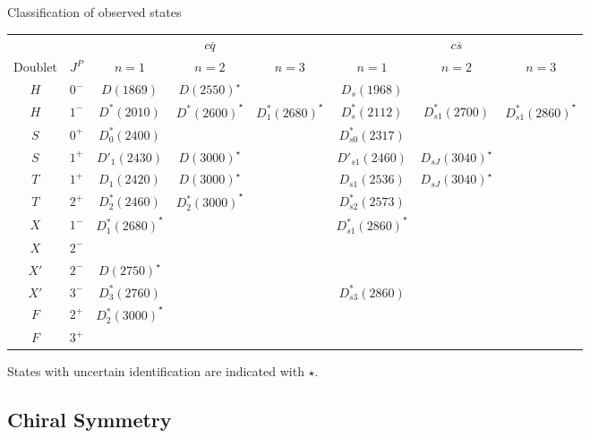\documentclass[professionalfonts,aspectratio=169]{beamer}
\newcommand{\adj}[1]{\overline{#1}}
\begin{document}
\begin{frame}{Classification of observed states}
  \begin{table}
    \centering
    \scriptsize
    \begin{tabular}{*{8}{c}}
      \toprule
      & & \multicolumn{3}{c}{$c \adj{q}$} & \multicolumn{3}{c}{$c \adj{s}$} \\
      Doublet { } & $J^P$ & $n = 1$ & $n = 2$ & $n = 3$ & $n = 1$ & $n = 2$ & $n = 3$ \\
      \midrule
      $H$ & $0^-$ & $D(1869)$ & $\left. D(2550) \right.^\star$ & & $D_s(1968)$ & & \\ 
      $H$ & $1^-$ & $D^*(2010)$ & $\left. D^* (2600) \right.^\star$ & $\left. D^*_1(2680) \right.^\star$ & $D_s^*(2112)$ & $D_{s1}^*(2700)$ & $\left. D^*_{s 1}(2860) \right.^\star$ \\
      $S$ & $0^+$ & $D^*_0(2400)$ & & & $D_{s0}^*(2317)$ & & \\
      $S$ & $1^+$ & $D'_1(2430)$ & $\left. D(3000) \right.^\star$ & & $D'_{s1}(2460)$ & $\left. D_{sJ}(3040) \right.^\star$ & \\
      $T$ & $1^+$ & $D_1(2420)$ & $\left. D(3000) \right.^\star$ & & $D_{s1}(2536)$ & $\left. D_{sJ}(3040) \right.^\star$ & \\
      $T$ & $2^+$ & $D^*_2(2460)$ & \alert{$\left. D^*_2(3000) \right.^\star$} & & $D_{s2}^*(2573)$ & & \\
      $X$ & $1^-$ & $\left. D^*_1(2680) \right.^\star$ & & & $\left. D^*_{s 1}(2860) \right.^\star$ & & \\
      $X$ & $2^-$ & & & & & & \\
      $X'$ & $2^-$ & $\left. D(2750) \right.^\star$ & & & & & \\
      $X'$ & $3^-$ & $D^*_3(2760)$ & & & $D^*_{s 3}(2860)$ & & \\
      $F$ & $2^+$ & \alert{$\left. D^*_2(3000) \right.^\star$} & & & & & \\
      $F$ & $3^+$ & & & & & & \\
      \bottomrule
    \end{tabular}
  \end{table}
  States with uncertain identification are indicated with $\star$.
\end{frame}

\subsection{Chiral Symmetry}
\end{document}
